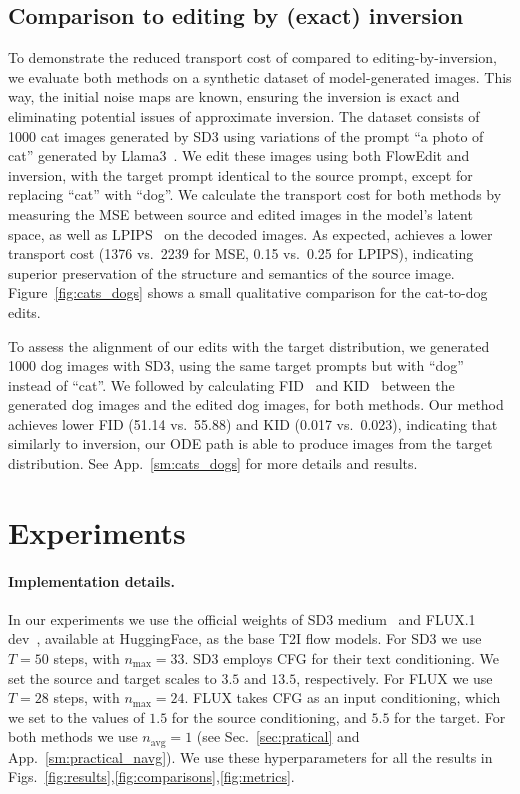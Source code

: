 \subsection{Comparison to editing by (exact) inversion}
\label{sec:cats_dogs_exp}
To demonstrate the reduced transport cost of \ours{} compared to editing-by-inversion, we evaluate both methods on a synthetic dataset of model-generated images. 
This way, the initial noise maps are known, ensuring the inversion is exact and eliminating potential issues of approximate inversion. The dataset consists of 1000 cat images generated by SD3 using variations of the prompt ``a photo of cat'' generated by Llama3~\citep{dubey2024llama3}.
We edit these images using both FlowEdit and inversion, with the target prompt identical to the source prompt, except for replacing ``cat'' with ``dog''. We calculate the transport cost for both methods by measuring the MSE between source and edited images in the model's latent space, as well as LPIPS~\cite{zhang2018unreasonable} on the decoded images. 
As expected, \ours{} achieves a lower transport cost (1376 vs.~2239 for MSE, 0.15 vs.~0.25 for LPIPS), indicating superior preservation of the structure and semantics of the source image. 
Figure~\ref{fig:cats_dogs} shows a small qualitative comparison for the cat-to-dog edits.

To assess the alignment of our edits with the target distribution, we generated 1000 dog images with SD3, using the same target prompts but with ``dog'' instead of ``cat''. We followed by calculating FID~\citep{heusel2017fid} and KID~\citep{bińkowski2018kid} between the generated dog images and the edited dog images, for both methods. Our method achieves lower FID (51.14 vs.~55.88) and KID (0.017 vs.~0.023), indicating that similarly to inversion, our ODE path is able to produce images from the target distribution.
See App.~\ref{sm:cats_dogs} for more details and results. 

\section{Experiments}
\label{sec:evalution}
\paragraph{Implementation details.}

In our experiments we use the official weights of SD3 medium~\cite{sd3-medium-weights} and FLUX.1 dev~\cite{flux.1-dev-weights}, available at HuggingFace, as the base T2I flow models. 
For SD3 we use $T=50$ steps, with $n_{\text{max}}=33$. SD3 employs CFG \cite{ho2021classifier} for their text conditioning. We set the source and target scales to $3.5$ and $13.5$, respectively. 
For FLUX we use $T=28$ steps, with $n_{\text{max}}=24$. FLUX takes CFG as an input conditioning, which we set to the values of $1.5$ for the source conditioning, and $5.5$ for the target. 
For both methods we use $n_{\text{avg}}=1$ (see Sec.~\ref{sec:pratical} and App.~\ref{sm:practical_navg}). 
We use these hyperparameters for all the results in Figs.~\ref{fig:results},\ref{fig:comparisons},\ref{fig:metrics}. 


